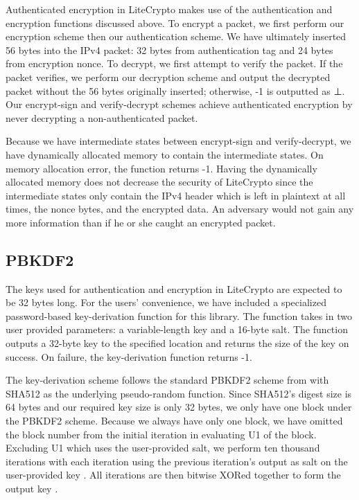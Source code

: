 \documentclass[12pt]{article}
\begin{document}
\begin{multicols}{2}
Authenticated encryption in LiteCrypto makes use of the authentication and encryption functions discussed above. To encrypt a packet, we first perform our encryption scheme then our authentication scheme. We have ultimately inserted 56 bytes into the IPv4 packet: 32 bytes from authentication tag and 24 bytes from encryption nonce. To decrypt, we first attempt to verify the packet. If the packet verifies, we perform our decryption scheme and output the decrypted packet without the 56 bytes originally inserted; otherwise, -1 is outputted as ⊥. Our encrypt-sign and verify-decrypt schemes achieve authenticated encryption by never decrypting a non-authenticated packet.

Because we have intermediate states between encrypt-sign and verify-decrypt, we have dynamically allocated memory to contain the intermediate states. On memory allocation error, the function returns -1. Having the dynamically allocated memory does not decrease the security of LiteCrypto since the intermediate states only contain the IPv4 header which is left in plaintext at all times, the nonce bytes, and the encrypted data. An adversary would not gain any more information than if he or she caught an encrypted packet.

\subsection{PBKDF2}

The keys used for authentication and encryption in LiteCrypto are expected to be 32 bytes long. For the users' convenience, we have included a specialized password-based key-derivation function for this library. The function takes in two user provided parameters: a variable-length key and a 16-byte salt. The function outputs a 32-byte key to the specified location and returns the size of the key on success. On failure, the key-derivation function returns -1.

The key-derivation scheme follows the standard PBKDF2 scheme from \cite{PBKDF2Standard} with SHA512 as the underlying pseudo-random function. Since SHA512's digest size is 64 bytes \cite{NaClSiteHash} and our required key size is only 32 bytes, we only have one block under the PBKDF2 scheme. Because we always have only one block, we have omitted the block number from the initial iteration in evaluating U1 of the block. Excluding U1 which uses the user-provided salt, we perform ten thousand iterations with each iteration using the previous iteration's output as salt on the user-provided key \cite{PBKDF2Standard}. All iterations are then bitwise XORed together to form the output key \cite{PBKDF2Standard}.


\end{multicols}
\end{document}
